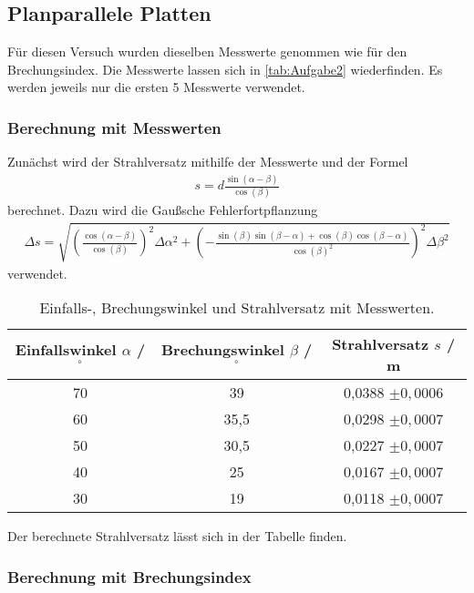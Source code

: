 \subsection{Planparallele Platten}

Für diesen Versuch wurden dieselben Messwerte genommen wie für den Brechungsindex. Die Messwerte lassen sich in \autoref{tab:Aufgabe2} wiederfinden.
Es werden jeweils nur die ersten 5 Messwerte verwendet.\\

\subsubsection{Berechnung mit Messwerten}
Zunächst wird der Strahlversatz mithilfe der Messwerte und der Formel
\begin{align}
  \label{eqn:Geschw}
  s = d \frac{\sin(\alpha - \beta)}{\cos(\beta)}
\end{align}
berechnet.
Dazu wird die Gaußsche Fehlerfortpflanzung
\begin{align}
  \label{eqn:Gauss2}
  \Delta s = \sqrt{\left(\frac{\cos(\alpha - \beta)}{\cos(\beta)}\right)^2 \Delta \alpha^2 + \left(-\frac{\sin(\beta)\sin(\beta - \alpha) + \cos(\beta)\cos(\beta - \alpha)}{\cos(\beta)^2}\right)^2 \Delta \beta^2}
\end{align}
verwendet.

\begin{table}
  \centering
  \caption{Einfalls-, Brechungswinkel und Strahlversatz mit Messwerten.}
  \label{tab:Aufgabe3}
  \begin{tabular}{c c c}
    \toprule
    Einfallswinkel $\alpha$ / $^{\circ}$& Brechungswinkel $\beta$ / $^{\circ}$ & Strahlversatz $s$ / m\\
    \midrule
    70 & 39 & 0,0388 $\pm 0,0006$ \\
    60 & 35,5& 0,0298 $\pm 0,0007$\\
    50 & 30,5& 0,0227 $\pm 0,0007$\\
    40 & 25& 0,0167 $\pm 0,0007$\\
    30 & 19& 0,0118 $\pm 0,0007$\\
    \bottomrule
  \end{tabular}
\end{table}

Der berechnete Strahlversatz lässt sich in der Tabelle finden.\\

\subsubsection{Berechnung mit Brechungsindex}

